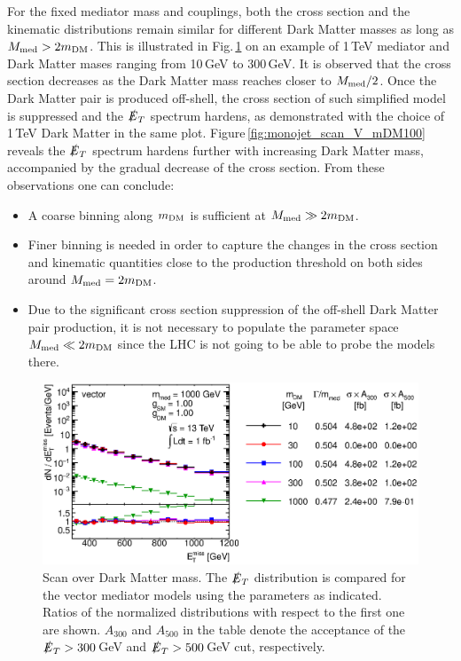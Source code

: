 For the fixed mediator mass and couplings, both the cross section and the kinematic distributions remain similar for different Dark Matter masses as long as $M_{\rm{med}}>2m_{\rm{DM}}$. This is illustrated in Fig.\,\ref{fig:monojet_scan_V_mDM1000} on an example of 1\,TeV mediator and Dark Matter mases ranging from 10\,GeV to 300\,GeV. It is observed that the cross section decreases as the Dark Matter mass reaches closer to $M_{\rm{med}}/2$. Once the Dark Matter pair is produced off-shell, the cross section of such simplified model is suppressed and the $\slashed{E}_T$ spectrum hardens, as demonstrated with the choice of 1\,TeV Dark Matter in the same plot. Figure\,\ref{fig:monojet_scan_V_mDM100} reveals the $\slashed{E}_T$ spectrum hardens further with increasing Dark Matter mass, accompanied by the gradual decrease of the cross section. From these observations one can conclude:
\begin{itemize}
\item A coarse binning along $m_{\rm{DM}}$ is sufficient at $M_{\rm{med}} \gg 2m_{\rm{DM}}$.
\item Finer binning is needed in order to capture the changes in the cross section and kinematic quantities close to the production threshold on both sides around $M_{\rm{med}}=2m_{\rm{DM}}$.
\item Due to the significant cross section suppression of the off-shell Dark Matter pair production, it is not necessary to populate the parameter space $M_{\rm{med}} \ll 2m_{\rm{DM}}$ since the LHC is not going to be able to probe the models there.
\end{itemize}

\begin{figure}
\centering
\includegraphics[width=0.9\linewidth]{figures/monojet/scan_mDM_V_1000.eps}
\caption{Scan over Dark Matter mass. The $\slashed{E}_T$ distribution is compared for the vector mediator models using the parameters as indicated. Ratios of the normalized distributions with respect to the first one are shown. $A_{300}$ and $A_{500}$ in the table denote the acceptance of the $\slashed{E}_T>300$\,GeV and $\slashed{E}_T>500$\,GeV cut, respectively.}
\label{fig:monojet_scan_V_mDM1000}
\end{figure}

